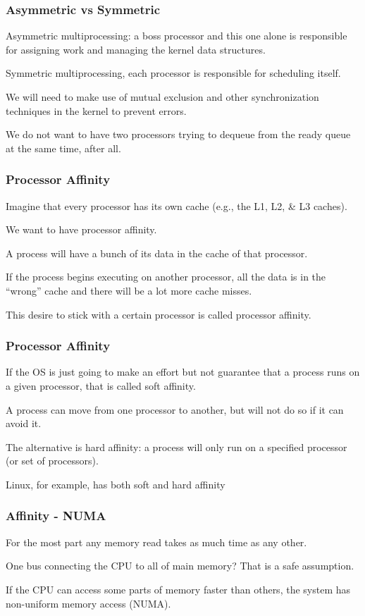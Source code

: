 \begin{frame}
\frametitle{Asymmetric vs Symmetric}
Asymmetric multiprocessing: a boss processor and this one alone is responsible for assigning work and managing the kernel data structures. 

Symmetric multiprocessing, each processor is responsible for scheduling itself. 

We will need to make use of mutual exclusion and other synchronization techniques in the kernel to prevent errors.

We do not want to have two processors trying to dequeue from the ready queue at the same time, after all.

\end{frame}

\begin{frame}
\frametitle{Processor Affinity}

Imagine that every processor has its own cache (e.g., the L1, L2, \& L3 caches).

We want to have \alert{processor affinity}. 

A process will have a bunch of its data in the cache of that processor. 

If the process begins executing on another processor, all the data is in the ``wrong'' cache and there will be a lot more cache misses. 

This desire to stick with a certain processor is called processor affinity.


\end{frame}

\begin{frame}
\frametitle{Processor Affinity}

If the OS is just going to make an effort but not guarantee that a process runs on a given processor, that is called \alert{soft affinity}. 

A process can move from one processor to another, but will not do so if it can avoid it. 

The alternative is \alert{hard affinity}: a process will only run on a specified processor (or set of processors). 

Linux, for example, has both soft and hard affinity

\end{frame}

\begin{frame}
\frametitle{Affinity - NUMA}

For the most part any memory read takes as much time as any other. 

One bus connecting the CPU to all of main memory? That is a safe assumption.

  If the CPU can access some parts of memory faster than others, the system has \alert{non-uniform memory access} (NUMA).

\end{frame}

